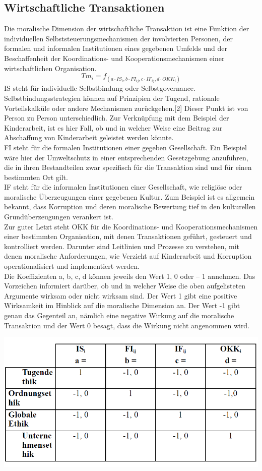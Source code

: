 \documentclass[12pt]{article}
\begin{document}
\subsection{Wirtschaftliche Transaktionen}
Die moralische Dimension der wirtschaftliche Transaktion ist eine Funktion der individuellen Selbststeuerungsmechanismen der involvierten Personen, der formalen und informalen Institutionen eines gegebenen Umfelds und der Beschaffenheit der Koordinations- und Kooperationsmechanismen einer wirtschaftlichen Organisation.
\[Tm_i=f_{(a\cdot IS_i, b\cdot FI_{ij}, c\cdot IF_{ij}, d\cdot OKK_i)}\]
IS steht für individuelle Selbstbindung oder Selbstgovernance. Selbstbindungsstrategien können auf Prinzipien der Tugend, rationale Vorteilskalküle oder andere Mechanismen zurückgehen.[2] Dieser Punkt ist von Person zu Person unterschiedlich. Zur Verknüpfung mit dem Beispiel der Kinderarbeit, ist es hier Fall, ob und in welcher Weise eine Beitrag zur Abschaffung von Kinderarbeit geleistet werden könnte.\\
FI steht für die formalen Institutionen einer gegeben Gesellschaft. Ein Beispiel wäre hier der Umweltschutz in einer entsprechenden Gesetzgebung anzuführen, die in ihren Bestandteilen zwar spezifisch für die Transaktion sind und für einen bestimmten Ort gilt.
\\
IF steht für die informalen Institutionen einer Gesellschaft, wie religiöse oder moralische Überzeugungen einer gegebenen Kultur. Zum Beispiel ist es allgemein bekannt, dass Korruption und deren moralische Bewertung tief in den kulturellen Grundüberzeugungen verankert ist.\\
Zur guter Letzt steht OKK für die Koordinations- und Kooperationsmechanismen einer bestimmten Organisation, mit denen Transaktionen geführt, gesteuert und kontrolliert werden. Darunter sind Leitlinien und Prozesse zu verstehen, mit denen moralische Anforderungen, wie Verzicht auf Kinderarbeit und Korruption operationalisiert und implementiert werden.\\
Die Koeffizienten a, b, c, d können jeweils den Wert 1, 0 oder – 1 annehmen. Das Vorzeichen informiert darüber, ob und in welcher Weise die oben aufgelisteten Argumente wirksam oder nicht wirksam sind. Der Wert 1 gibt eine positive Wirksamkeit im Hinblick auf die moralische Dimension an. Der Wert -1 gibt genau das Gegenteil an, nämlich eine negative Wirkung auf die moralische Transaktion und der Wert 0 besagt, dass die Wirkung nicht angenommen wird.
\begin{center}
\includegraphics[width=.7\textwidth]{wieland_tabelle.png}
\end{center}


\clearpage
\frontmatter%
\renewcommand{\plaintitle}{Literaturverzeichnis}
\setcounter{page}{3}
\printMyBibliography
\end{document}
